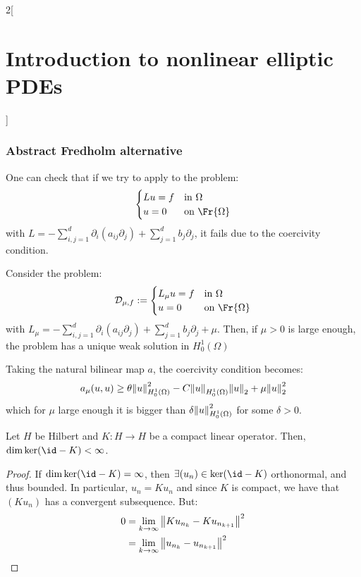 \documentclass[../../../main_math.tex]{subfiles}
\begin{document}
\begin{multicols}{2}[\section{Introduction to nonlinear elliptic PDEs}]
  \subsubsection{Abstract Fredholm alternative}
  \begin{remark}
    One can check that if we try to apply  to the problem:
    $$
      \begin{cases}
        Lu=f & \text{in }\Omega      \\
        u=0  & \text{on }\Fr{\Omega}
      \end{cases}
    $$
    with $L=-\sum_{i,j=1}^d\partial_i(a_{ij}\partial_j)+\sum_{j=1}^db_j\partial_j$, it fails due to the coercivity condition.
  \end{remark}
  \begin{proposition}\label{INEPDE:Lmu}
    Consider the problem:
    $$
      \mathcal{D}_{\mu,f}:=\begin{cases}
        L_\mu u=f & \text{in }\Omega      \\
        u=0       & \text{on }\Fr{\Omega}
      \end{cases}
    $$
    with $L_\mu=-\sum_{i,j=1}^d\partial_i(a_{ij}\partial_j)+\sum_{j=1}^db_j\partial_j+\mu$. Then, if $\mu>0$ is large enough, the problem has a unique weak solution in $H_0^1(\Omega)$
  \end{proposition}
  \begin{sproof}
    Taking the natural bilinear map $a$, the coercivity condition becomes:
    $$
      a_\mu(u,u)\geq \theta \norm{u}_{H_0^1(\Omega)}^2-C\norm{u}_{H_0^1(\Omega)}\norm{u}_2 + \mu \norm{u}_2^2
    $$
    which for $\mu$ large enough it is bigger than $\delta \norm{u}_{H_0^1(\Omega)}^2$ for some $\delta>0$.
  \end{sproof}
  \begin{lemma}\label{INEPDE:lemma1_fredholm}
    Let $H$ be Hilbert and $K:H\to H$ be a compact linear operator. Then, $\dim \ker(\id-K)<\infty$.
  \end{lemma}
  \begin{proof}
    If $\dim\ker(\id-K)=\infty$, then $\exists (u_n)\in \ker(\id-K)$ orthonormal, and thus bounded. In particular, $u_n=Ku_n$ and since $K$ is compact, we have that $(Ku_n)$ has a convergent subsequence. But:
    \begin{align*}
      0 & =\lim_{k\to\infty}\norm{Ku_{n_k}-Ku_{n_{k+1}}}^2        \\
        & =\lim_{k\to\infty}\norm{u_{n_k}-u_{n_{k+1}}}^2          \\

\end{align*}
\end{proof}
\end{multicols}
\end{document}
